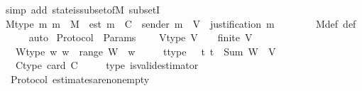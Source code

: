 \begin{isabellebody}
\isatagproof
{}\isamarkupfalse%
\ {\isacharparenleft}simp\ add{\isacharcolon}\ state{\isacharunderscore}is{\isacharunderscore}subset{\isacharunderscore}of{\isacharunderscore}M\ subsetI{\isacharparenright}%
\endisatagproof
{\isafoldproof}%
%
\isadelimproof
\isanewline
%
\endisadelimproof
\isanewline
\ \ \isamarkupfalse%
\ M{\isacharunderscore}type{\isacharcolon}\ {\isachardoublequoteopen}{\isasymAnd}m{\isachardot}\ m\ {\isasymin}\ M\ {\isasymLongrightarrow}\ est\ m\ {\isasymin}\ C\ {\isasymand}\ sender\ m\ {\isasymin}\ V\ {\isasymand}\ justification\ m\ {\isasymin}\ {\isasymSigma}{\isachardoublequoteclose}\isanewline
%
\isadelimproof
\ \ \ \ %
\endisadelimproof
%
\isatagproof
{}\isamarkupfalse%
\ M{\isacharunderscore}def\ {\isasymSigma}{\isacharunderscore}def\isanewline
\ \ \ \ \isamarkupfalse%
\ auto%
\endisatagproof
{\isafoldproof}%
%
\isadelimproof
\isanewline
%
\endisadelimproof
\isanewline
{}\isamarkupfalse%
\isanewline
\isanewline
\isanewline
{}\isamarkupfalse%
\ Protocol\ {\isacharequal}\ Params\ {\isacharplus}\isanewline
\ \ \ V{\isacharunderscore}type{\isacharcolon}\ {\isachardoublequoteopen}V\ {\isasymnoteq}\ {\isasymemptyset}\ {\isasymand}\ finite\ V{\isachardoublequoteclose}\isanewline
\ \ \ W{\isacharunderscore}type{\isacharcolon}\ {\isachardoublequoteopen}{\isasymAnd}w{\isachardot}\ w\ {\isasymin}\ range\ W\ {\isasymLongrightarrow}\ w\ {\isachargreater}\ {}{\isachardoublequoteclose}\isanewline
\ \ \ t{\isacharunderscore}type{\isacharcolon}\ {\isachardoublequoteopen}{}\ {\isasymle}\ t{\isachardoublequoteclose}\ {\isachardoublequoteopen}t\ {\isacharless}\ Sum\ {\isacharparenleft}W\ {\isacharbackquote}\ V{\isacharparenright}{\isachardoublequoteclose}\isanewline
\ \ \ C{\isacharunderscore}type{\isacharcolon}\ {\isachardoublequoteopen}card\ C\ {\isachargreater}\ {}{\isachardoublequoteclose}\isanewline
\ \ \ {\isasymepsilon}{\isacharunderscore}type{\isacharcolon}\ {\isachardoublequoteopen}is{\isacharunderscore}valid{\isacharunderscore}estimator\ {\isasymepsilon}{\isachardoublequoteclose}\isanewline
\isanewline
{}\isamarkupfalse%
\ {\isacharparenleft}\ Protocol{\isacharparenright}\ estimates{\isacharunderscore}are{\isacharunderscore}non{\isacharunderscore}empty{\isacharcolon}\ {\isachardoublequoteopen}{\isasymAnd}\ {\isasymsigma}{\isachardot}\ {\isasymsigma}\ {\isasymin}\ {\isasymSigma}\ {\isasymLongrightarrow}\ {\isasymepsilon}\ {\isasymsigma}\ {\isasymnoteq}\ {\isasymemptyset}{\isachardoublequoteclose}\isanewline

\end{isabellebody}
